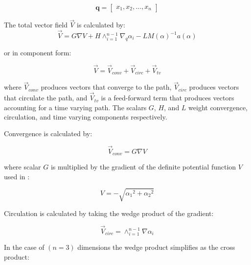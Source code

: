 \documentclass[numbered,pdftex]{ohio-etd}
\begin{document}
\begin{equation}
\mathbf{q} = \begin{bmatrix} x_1, x_2, ..., x_{n}\end{bmatrix}
\end{equation}

\noindent
The total vector field $\overrightarrow{V}$ is calculated by:
\begin{equation}\label{eq:GVF}
\overrightarrow{V} = G \nabla V + H \wedge_{i=1}^{n-1}\nabla_q\alpha_i  - LM(\alpha)^{-1} a(\alpha)
\end{equation}

\noindent
or in component form:

\begin{equation}\label{simpleGVF}
\overrightarrow{V} = \overrightarrow{V}_{conv} + \overrightarrow{V}_{circ} + \overrightarrow{V}_{tv} 
\end{equation}	

\noindent
where $\overrightarrow{V}_{conv}$ produces vectors that converge to the path, $\overrightarrow{V}_{circ}$ produces vectors that circulate the path, and $\overrightarrow{V}_{tv}$ is a feed-forward term that produces vectors accounting for a time varying path. The scalars $G$, $H$, and $L$ weight convergence, circulation, and time varying components respectively. 

\noindent
Convergence is calculated by:

\begin{equation}
\overrightarrow{V}_{conv} = G \nabla V  
\label{convOnly}
\end{equation}

\noindent
where scalar $G$ is multiplied by the gradient of the definite potential function $V$ used in \cite{goncalves_circulation_2010}:

\begin{equation}
\label{potentialV}
V = -\sqrt{{\alpha_1}^2 + {\alpha_2}^2}
\end{equation}


\noindent
Circulation is calculated by taking the wedge product of the gradient:

\begin{equation}
\overrightarrow{V}_{circ} =  \wedge_{i=1}^{n-1}\nabla\alpha_i 
\label{circOnly}
\end{equation}

\noindent
In the case of $(n=3)$ dimensions the wedge product simplifies as the cross product:
\end{document}
